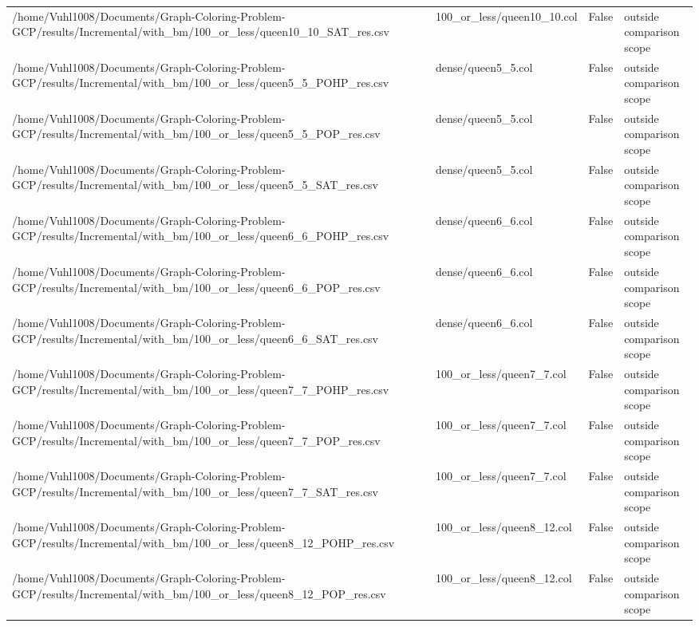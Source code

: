 \begin{table}[htbp]
\begin{tabular}{llll}
/home/Vuhl1008/Documents/Graph-Coloring-Problem-GCP/results/Incremental/with\_bm/100\_or\_less/queen10\_10\_SAT\_res.csv & 100\_or\_less/queen10\_10.col & False & outside comparison scope \\
/home/Vuhl1008/Documents/Graph-Coloring-Problem-GCP/results/Incremental/with\_bm/100\_or\_less/queen5\_5\_POHP\_res.csv & dense/queen5\_5.col & False & outside comparison scope \\
/home/Vuhl1008/Documents/Graph-Coloring-Problem-GCP/results/Incremental/with\_bm/100\_or\_less/queen5\_5\_POP\_res.csv & dense/queen5\_5.col & False & outside comparison scope \\
/home/Vuhl1008/Documents/Graph-Coloring-Problem-GCP/results/Incremental/with\_bm/100\_or\_less/queen5\_5\_SAT\_res.csv & dense/queen5\_5.col & False & outside comparison scope \\
/home/Vuhl1008/Documents/Graph-Coloring-Problem-GCP/results/Incremental/with\_bm/100\_or\_less/queen6\_6\_POHP\_res.csv & dense/queen6\_6.col & False & outside comparison scope \\
/home/Vuhl1008/Documents/Graph-Coloring-Problem-GCP/results/Incremental/with\_bm/100\_or\_less/queen6\_6\_POP\_res.csv & dense/queen6\_6.col & False & outside comparison scope \\
/home/Vuhl1008/Documents/Graph-Coloring-Problem-GCP/results/Incremental/with\_bm/100\_or\_less/queen6\_6\_SAT\_res.csv & dense/queen6\_6.col & False & outside comparison scope \\
/home/Vuhl1008/Documents/Graph-Coloring-Problem-GCP/results/Incremental/with\_bm/100\_or\_less/queen7\_7\_POHP\_res.csv & 100\_or\_less/queen7\_7.col & False & outside comparison scope \\
/home/Vuhl1008/Documents/Graph-Coloring-Problem-GCP/results/Incremental/with\_bm/100\_or\_less/queen7\_7\_POP\_res.csv & 100\_or\_less/queen7\_7.col & False & outside comparison scope \\
/home/Vuhl1008/Documents/Graph-Coloring-Problem-GCP/results/Incremental/with\_bm/100\_or\_less/queen7\_7\_SAT\_res.csv & 100\_or\_less/queen7\_7.col & False & outside comparison scope \\
/home/Vuhl1008/Documents/Graph-Coloring-Problem-GCP/results/Incremental/with\_bm/100\_or\_less/queen8\_12\_POHP\_res.csv & 100\_or\_less/queen8\_12.col & False & outside comparison scope \\
/home/Vuhl1008/Documents/Graph-Coloring-Problem-GCP/results/Incremental/with\_bm/100\_or\_less/queen8\_12\_POP\_res.csv & 100\_or\_less/queen8\_12.col & False & outside comparison scope \\

\end{tabular}
\end{table}
